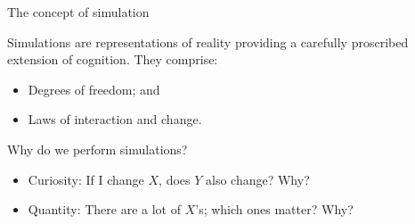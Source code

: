 \begin{frame}[fragile]{The concept of simulation}

Simulations are representations of reality providing a \textcolor{red!80!black}{carefully proscribed extension of cognition}. They comprise:

\begin{itemize}
    \item Degrees of freedom; and
    \item Laws of interaction and change.
\end{itemize}
    
Why do we perform simulations?

\begin{itemize}
    \item \textcolor{blue!80!black}{Curiosity}: If I change $X$, does $Y$ also change?  Why?
    \item \textcolor{green!80!black}{Quantity}: There are a lot of $X$'s; which ones matter? Why?
\end{itemize}

\end{frame}
